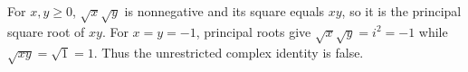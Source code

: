 For $x,y\ge0$, $\sqrt x\sqrt y$ is nonnegative and its square equals $xy$, so it is the principal square root of $xy$. For $x=y=-1$, principal roots give $\sqrt x\sqrt y=i^2=-1$ while $\sqrt{xy}=\sqrt1=1$. Thus the unrestricted complex identity is false.

